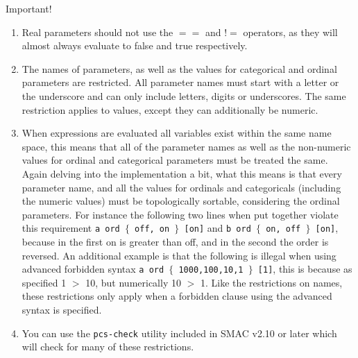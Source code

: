 \documentclass[manual.tex]{subfiles}
\begin{document}
\begin{bclogo}[logo=\bcattention, couleurBarre=red, noborder=true]{Important!}
\begin{enumerate}
\item Real parameters should not use the $==$ and $!=$ operators, as they will almost always evaluate to false and true respectively.

\item The names of parameters, as well as the values for categorical and ordinal parameters are restricted. All parameter names must start with a letter or the underscore and can only include letters, digits or underscores. The same restriction applies to values, except they can additionally be numeric.

\item When expressions are evaluated all variables exist within the same name space, this means that all of the parameter names as well as the non-numeric values for ordinal and categorical parameters must be treated the same. Again delving into the implementation a bit, what this means is that every parameter name, and all the values for ordinals and categoricals (including the numeric values) must be topologically sortable, considering the ordinal parameters. For instance the following two lines when put together violate this requirement \texttt{a ord $\{$ off, on $\}$ [on]} and \texttt{b ord $\{$ on, off $\}$ [on]}, because in the first on is greater than off, and in the second the order is reversed. An additional example is that the following is illegal when using advanced forbidden syntax \texttt{a ord $\{$ 1000,100,10,1 $\}$ [1]}, this is because as specified 1 $>$ 10, but numerically 10 $>$ 1. Like the restrictions on names, these restrictions only apply when a forbidden clause using the advanced syntax is specified.

\item You can use the \texttt{pcs-check} utility included in SMAC v2.10 or later which will check for many of these restrictions.
\end{enumerate}

\end{bclogo}
\end{document}
